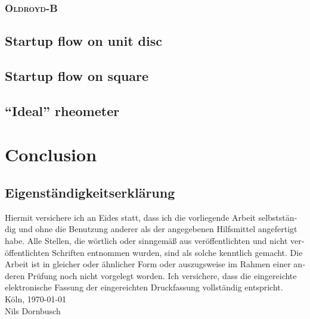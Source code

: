 \documentclass[12pt,a4paper,twoside, open=right]{scrreprt}
\theoremstyle{definition}
\theoremstyle{plain}
\begin{document}
\subsection{\textsc{Oldroyd-B}}
\section{Startup flow on unit disc}
\section{Startup flow on square}
\section{\enquote{Ideal} rheometer}

\chapter{Conclusion}

\setcounter{lofdepth}{2}
\listoffigures
\newpage
{}

{}
\newpage
\begin{otherlanguage}{ngerman}
\chapter*{Eigenständigkeitserklärung}
Hiermit versichere ich an Eides statt, dass ich die vorliegende Arbeit selbstständig und ohne die Benutzung anderer als der angegebenen  Hilfsmittel  angefertigt  habe.  
Alle  Stellen,  die  wörtlich  oder  sinngemäß  aus  veröffentlichten  und  nicht  veröffentlichten  Schriften  entnommen  wurden,  sind  als  solche  kenntlich  gemacht.  
Die  Arbeit  ist  in  gleicher  oder  ähnlicher  Form  oder  auszugsweise  im  Rahmen  einer  anderen  Prüfung  noch  nicht  vorgelegt  worden. 
Ich  versichere,  dass  die  eingereichte    elektronische    Fassung    der    eingereichten    Druckfassung    vollständig    entspricht.
\\[\bigskipamount]
Köln, \today
\\[2\bigskipamount]
Nils Dornbusch
\end{otherlanguage}
\end{document}
